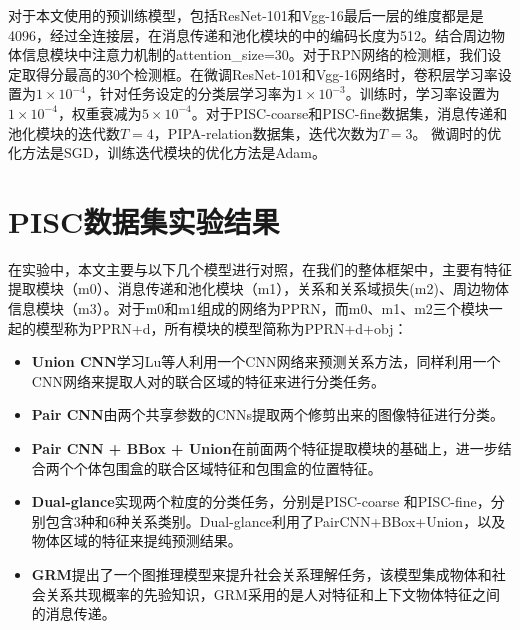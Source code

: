 对于本文使用的预训练模型，包括ResNet-101和Vgg-16最后一层的维度都是是4096，经过全连接层，在消息传递和池化模块的中的编码长度为512。结合周边物体信息模块中注意力机制的attention\_size=30。对于RPN网络的检测框，我们设定取得分最高的30个检测框。在微调ResNet-101和Vgg-16网络时，卷积层学习率设置为$1 \times 10^{-4}$，针对任务设定的分类层学习率为$1 \times 10^{-3}$。训练时，学习率设置为$1 \times 10^{-4}$，权重衰减为$5 \times 10^{-4}$。对于PISC-coarse和PISC-fine数据集，消息传递和池化模块的迭代数$T=4$，PIPA-relation数据集，迭代次数为$T=3$。 微调时的优化方法是SGD，训练迭代模块的优化方法是Adam。

\section{PISC数据集实验结果}
在实验中，本文主要与以下几个模型进行对照，在我们的整体框架中，主要有特征提取模块（m0）、消息传递和池化模块（m1），关系和关系域损失(m2)、周边物体信息模块（m3）。对于m0和m1组成的网络为PPRN，而m0、m1、m2三个模块一起的模型称为PPRN+d，所有模块的模型简称为PPRN+d+obj：
\begin{itemize}
    \item \textbf{Union CNN}学习Lu等人\cite{lu2016visual}利用一个CNN网络来预测关系方法，同样利用一个CNN网络来提取人对的联合区域的特征来进行分类任务。
    \item \textbf{Pair CNN}\cite{li2017dual-glance}由两个共享参数的CNNs提取两个修剪出来的图像特征进行分类。
    \item \textbf{Pair CNN + BBox + Union}\cite{li2017dual-glance}在前面两个特征提取模块的基础上，进一步结合两个个体包围盒的联合区域特征和包围盒的位置特征。
    \item \textbf{Dual-glance}\cite{li2017dual-glance}实现两个粒度的分类任务，分别是PISC-coarse 和PISC-fine，分别包含3种和6种关系类别。Dual-glance利用了PairCNN+BBox+Union，以及物体区域的特征来提纯预测结果。
    \item \textbf{GRM}\cite{wang2018deep}提出了一个图推理模型来提升社会关系理解任务，该模型集成物体和社会关系共现概率的先验知识，GRM采用的是人对特征和上下文物体特征之间的消息传递。
\end{itemize}

